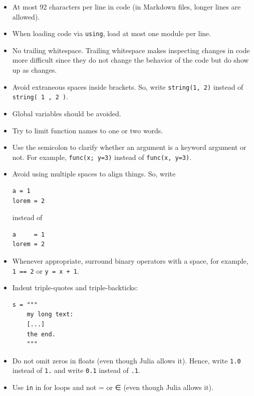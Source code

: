 \documentclass[
  notoc %
]{tufte-book}
\newcommand{\passthrough}[1]{#1}
\begin{document}
\begin{itemize}
\item
  At most 92 characters per line in code (in Markdown files, longer
  lines are allowed).
\item
  When loading code via \passthrough{\lstinline!using!}, load at most
  one module per line.
\item
  No trailing whitespace. Trailing whitespace makes inspecting changes
  in code more difficult since they do not change the behavior of the
  code but do show up as changes.
\item
  Avoid extraneous spaces inside brackets. So, write
  \passthrough{\lstinline!string(1, 2)!} instead of
  \passthrough{\lstinline!string( 1 , 2 )!}.
\item
  Global variables should be avoided.
\item
  Try to limit function names to one or two words.
\item
  Use the semicolon to clarify whether an argument is a keyword argument
  or not. For example, \passthrough{\lstinline!func(x; y=3)!} instead of
  \passthrough{\lstinline!func(x, y=3)!}.
\item
  Avoid using multiple spaces to align things. So, write

\begin{lstlisting}
a = 1
lorem = 2
\end{lstlisting}

  instead of

\begin{lstlisting}
a     = 1
lorem = 2
\end{lstlisting}
\item
  Whenever appropriate, surround binary operators with a space, for
  example, \passthrough{\lstinline!1 == 2!} or
  \passthrough{\lstinline!y = x + 1!}.
\item
  Indent triple-quotes and triple-backticks:

\begin{lstlisting}
s = """
    my long text:
    [...]
    the end.
    """
\end{lstlisting}
\item
  Do not omit zeros in floats (even though Julia allows it). Hence,
  write \passthrough{\lstinline!1.0!} instead of
  \passthrough{\lstinline!1.!} and write \passthrough{\lstinline!0.1!}
  instead of \passthrough{\lstinline!.1!}.
\item
  Use \passthrough{\lstinline!in!} in for loops and not = or ∈ (even
  though Julia allows it).
\end{itemize}
\end{document}
